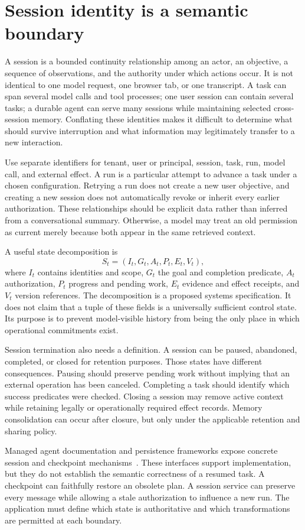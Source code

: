 \section{Session identity is a semantic boundary}\label{sec:C13:identity}
A session is a bounded continuity relationship among an actor, an objective, a sequence of observations, and the authority under which actions occur. It is not identical to one model request, one browser tab, or one transcript. A task can span several model calls and tool processes; one user session can contain several tasks; a durable agent can serve many sessions while maintaining selected cross-session memory. Conflating these identities makes it difficult to determine what should survive interruption and what information may legitimately transfer to a new interaction.

Use separate identifiers for tenant, user or principal, session, task, run, model call, and external effect. A run is a particular attempt to advance a task under a chosen configuration. Retrying a run does not create a new user objective, and creating a new session does not automatically revoke or inherit every earlier authorization. These relationships should be explicit data rather than inferred from a conversational summary. Otherwise, a model may treat an old permission as current merely because both appear in the same retrieved context.

A useful state decomposition is
\begin{equation}
 S_t=(I_t,G_t,A_t,P_t,E_t,V_t),
\end{equation}
where $I_t$ contains identities and scope, $G_t$ the goal and completion predicate, $A_t$ authorization, $P_t$ progress and pending work, $E_t$ evidence and effect receipts, and $V_t$ version references. The decomposition is a proposed systems specification. It does not claim that a tuple of these fields is a universally sufficient control state. Its purpose is to prevent model-visible history from being the only place in which operational commitments exist.

Session termination also needs a definition. A session can be paused, abandoned, completed, or closed for retention purposes. Those states have different consequences. Pausing should preserve pending work without implying that an external operation has been canceled. Completing a task should identify which success predicates were checked. Closing a session may remove active context while retaining legally or operationally required effect records. Memory consolidation can occur after closure, but only under the applicable retention and sharing policy.

Managed agent documentation and persistence frameworks expose concrete session and checkpoint mechanisms~\cite{openai2026agents,langgraph2026docs}. These interfaces support implementation, but they do not establish the semantic correctness of a resumed task. A checkpoint can faithfully restore an obsolete plan. A session service can preserve every message while allowing a stale authorization to influence a new run. The application must define which state is authoritative and which transformations are permitted at each boundary.

